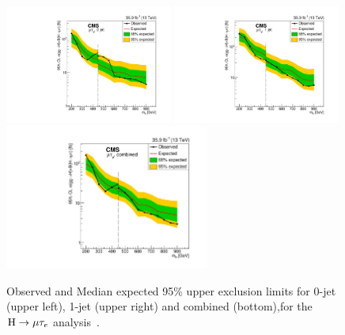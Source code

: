 \begin{figure}[!htpb]\centering
   \captionsetup{width=.98\textwidth,justification=centering}
 \includegraphics[width=0.49\textwidth]{plots_and_figures/chapter8/highmass/Figure_004-c.pdf}
 \includegraphics[width=0.49\textwidth]{plots_and_figures/chapter8/highmass/Figure_004-d.pdf} \\
 \includegraphics[width=0.60\textwidth]{plots_and_figures/chapter8/highmass/Figure_005-b.pdf}
\caption{Observed and Median expected 95\% upper exclusion limits for 0-jet (upper left), 1-jet (upper right) and combined (bottom),for the $\text{H} \to \mu \tau_{e}$ analysis~\cite{HIG-18-017}.}
 \label{fig:limits_Hmue}
\end{figure}



